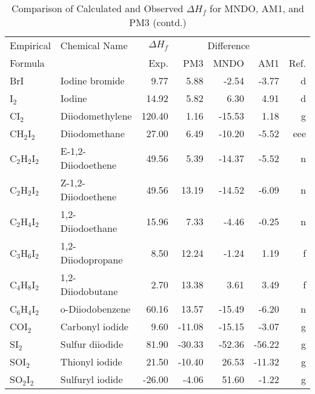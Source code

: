 \begin{table}
\caption{Comparison of Calculated and Observed $\Delta H_f$ 
for MNDO, AM1, and PM3 (contd.)}
\begin{center}
\compresstable
\begin{tabular}{llrrrrr}
Empirical & Chemical Name & $\Delta H_f$ & \multicolumn{3}{c}{Difference} & \\
Formula   &               & Exp. & PM3 &  MNDO  &  AM1 &     Ref.\\
\hline
 BrI         & Iodine bromide                  &     9.77    &     5.88  &    -2.54  &    -3.77  &      d\\
 I$_2$          & Iodine                          &    14.92    &     5.82  &     6.30  &     4.91  &      d\\
 CI$_2$         & Diiodomethylene                 &   120.40    &     1.16  &   -15.53  &     1.18  &      g\\
 CH$_2$I$_2$       & Diiodomethane                   &    27.00    &     6.49  &   -10.20  &    -5.52  &    eee\\
 C$_2$H$_2$I$_2$      & E-1,2-Diiodoethene              &    49.56    &     5.39  &   -14.37  &    -5.52  &      n\\
 C$_2$H$_2$I$_2$      & Z-1,2-Diiodoethene              &    49.56    &    13.19  &   -14.52  &    -6.09  &      n\\
 C$_2$H$_4$I$_2$      & 1,2-Diiodoethane                &    15.96    &     7.33  &    -4.46  &    -0.25  &      n\\
 C$_3$H$_6$I$_2$      & 1,2-Diiodopropane               &     8.50    &    12.24  &    -1.24  &     1.19  &      f\\
 C$_4$H$_8$I$_2$      & 1,2-Diiodobutane                &     2.70    &    13.38  &     3.61  &     3.49  &      f\\
 C$_6$H$_4$I$_2$      & o-Diiodobenzene                 &    60.16    &    13.57  &   -15.49  &    -6.20  &      n\\
 COI$_2$        & Carbonyl iodide                 &     9.60    &   -11.08  &   -15.15  &    -3.07  &      g\\
 SI$_2$         & Sulfur diiodide                 &    81.90    &   -30.33  &   -52.36  &   -56.22  &      g\\
 SOI$_2$        & Thionyl iodide                  &    21.50    &   -10.40  &    26.53  &   -11.32  &      g\\
 SO$_2$I$_2$       & Sulfuryl iodide                 &   -26.00    &    -4.06  &    51.60  &    -1.22  &      g\\

\end{tabular}
\end{center}
\end{table}
